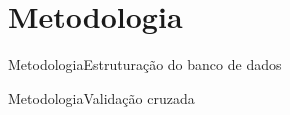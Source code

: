 \section[Metodologia]{Metodologia}
\begin{frame}{Metodologia}{Estruturação do banco de dados}
\end{frame}


\begin{frame}{Metodologia}{Validação cruzada}
\end{frame}